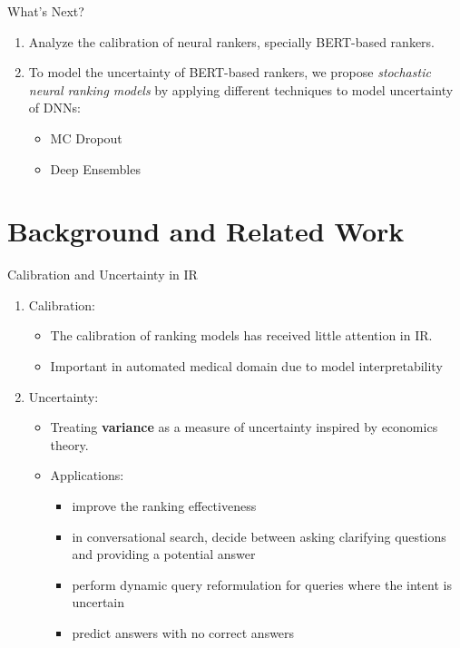 \documentclass{beamer}
\begin{document}
\begin{frame}{What's Next?}
\begin{enumerate}
    \item Analyze the calibration of neural rankers, specially BERT-based rankers.
    \item To model the uncertainty of BERT-based rankers, we propose \textsl{stochastic neural ranking models} by applying different techniques to model uncertainty of DNNs:
        \begin{itemize}
            \item MC Dropout
            \item Deep Ensembles
        \end{itemize}
\end{enumerate}
\end{frame}


\section{Background and Related Work}
\begin{frame}{Calibration and Uncertainty in IR}
\begin{enumerate}
    \item Calibration: 
        \begin{itemize}
            \item The calibration of ranking models has received little attention in IR.
            \item Important in automated medical domain due to model interpretability
        \end{itemize}
    \item Uncertainty: 
        \begin{itemize}
            \item Treating \textbf{variance} as a measure of uncertainty inspired by economics theory.
            \item Applications:
                \begin{itemize}
                    \item improve the ranking effectiveness
                    \item in conversational search, decide between asking clarifying questions and providing a potential answer
                    \item perform dynamic query reformulation for queries where the intent is uncertain
                    \item predict answers with no correct answers
                \end{itemize}
        \end{itemize}
\end{enumerate}
    
\end{frame}
\end{document}
